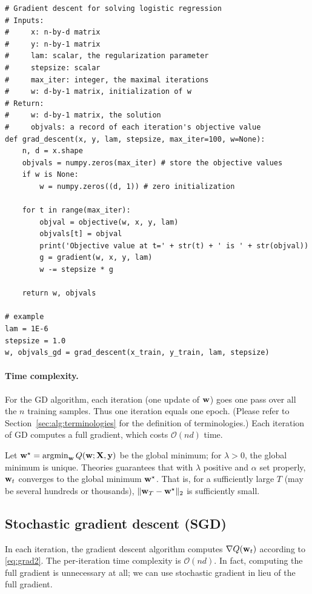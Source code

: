 \documentclass[11pt]{article}
\numberwithin{equation}{section}
\def\w{{\bf w}}
\def\X{{\bf X}}
\def\y{{\bf y}}
\def\OM{{\mathcal O}}
\def\argmin{\mathop{\rm argmin}}
\def\argmin{\mathop{\rm argmin}}
\begin{document}
\vspace{3mm}
\begin{lstlisting}
# Gradient descent for solving logistic regression
# Inputs:
#     x: n-by-d matrix
#     y: n-by-1 matrix
#     lam: scalar, the regularization parameter
#     stepsize: scalar
#     max_iter: integer, the maximal iterations
#     w: d-by-1 matrix, initialization of w
# Return:
#     w: d-by-1 matrix, the solution
#     objvals: a record of each iteration's objective value
def grad_descent(x, y, lam, stepsize, max_iter=100, w=None):
	n, d = x.shape
	objvals = numpy.zeros(max_iter) # store the objective values
	if w is None:
		w = numpy.zeros((d, 1)) # zero initialization
	
	for t in range(max_iter):
		objval = objective(w, x, y, lam)
		objvals[t] = objval
		print('Objective value at t=' + str(t) + ' is ' + str(objval))
		g = gradient(w, x, y, lam)
		w -= stepsize * g
	
	return w, objvals
	
# example
lam = 1E-6
stepsize = 1.0
w, objvals_gd = grad_descent(x_train, y_train, lam, stepsize)
\end{lstlisting}
\vspace{3mm}



\paragraph{Time complexity.}
For the GD algorithm,
each iteration (one update of $\w$) goes one pass over all the $n$ training samples.
Thus one iteration equals one epoch. 
(Please refer to Section~\ref{sec:alg:terminologies} for the definition of terminologies.)
Each iteration of GD computes a full gradient, which costs $\OM (nd)$ time.


Let $\w^\star = \argmin_{\w} Q (\w ; \X , \y)$ be the global minimum;
for $\lambda >0$, the global minimum is unique.
Theories guarantees that with $\lambda$ positive and $\alpha$ set properly,
$\w_t$ converges to the global minimum $\w^\star$.
That is, for a sufficiently large $T$ (may be several hundreds or thousands), 
$\| \w_T - \w^\star \|_2$ is sufficiently small.




\subsection{Stochastic gradient descent (SGD)} \label{sec:alg:sgd}

In each iteration, the gradient descent algorithm computes $ \nabla Q (\w_t)$ according to \eqref{eq:grad2}.
The per-iteration time complexity is $\OM (n d)$.
In fact, computing the full gradient is unnecessary at all;
we can use stochastic gradient in lieu of the full gradient.
\end{document}
